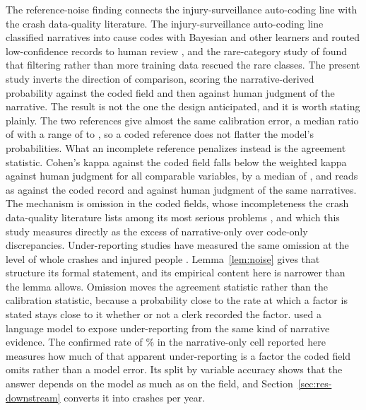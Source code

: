 The reference-noise finding connects the injury-surveillance auto-coding line with the crash
data-quality literature. The injury-surveillance auto-coding line classified narratives into cause codes with Bayesian and other learners \citep{lehto2009bayesian,bertke2016comparison} and routed low-confidence records to human review \citep{marucciwellman2015practical,marucciwellm2017classifyin},
and the rare-category study of \citet{nanda2018improving} found that filtering rather than
more training data rescued the rare classes. The present study inverts the direction of comparison, scoring the narrative-derived
probability against the coded field and then against human judgment of the narrative. The
result is not the one the design anticipated, and it is worth stating plainly. The two
references give almost the same calibration error, a median ratio of \ECEGapMedian{} with a
range of \ECEGapMin{} to \ECEGapMax{}, so a coded reference does not flatter the model's
probabilities. What an incomplete reference penalizes instead is the agreement statistic.
Cohen's kappa against the coded field falls below the weighted kappa against human judgment for
all
\KappaGapNPositive{} comparable variables, by a median of \KappaGapMedian{}, and
\KappaGapMaxVar{} reads as \KappaGapMaxCoded{} against the coded record and
\KappaGapMaxHuman{} against human judgment of the same narratives. The mechanism is omission in
the coded fields, whose incompleteness the crash data-quality literature lists among its most
serious problems \citep{imprialou2019quality}, and which this study measures directly as the
excess of narrative-only over code-only discrepancies. Under-reporting studies have measured
the same omission at the level of whole crashes and injured people
\citep{elvik1999incomplete,alsop2001underreporting,watson2015underreporting}.
Lemma~\ref{lem:noise} gives that structure its formal statement, and its empirical content
here is narrower than the lemma allows. Omission moves the agreement statistic rather than the
calibration statistic, because a probability close to the rate at which a factor is stated
stays close to it whether or not a clerk recorded the factor. \citet{arteaga2025a} used a language model to expose under-reporting from the same
kind of narrative evidence. The confirmed rate of \NarrOnly\% in the narrative-only cell
reported here measures how much of that apparent under-reporting is a factor the coded field
omits rather than a model error. Its split by variable accuracy shows that the answer depends
on the model as much as on the field, and Section~\ref{sec:res-downstream} converts it into
crashes per year.

